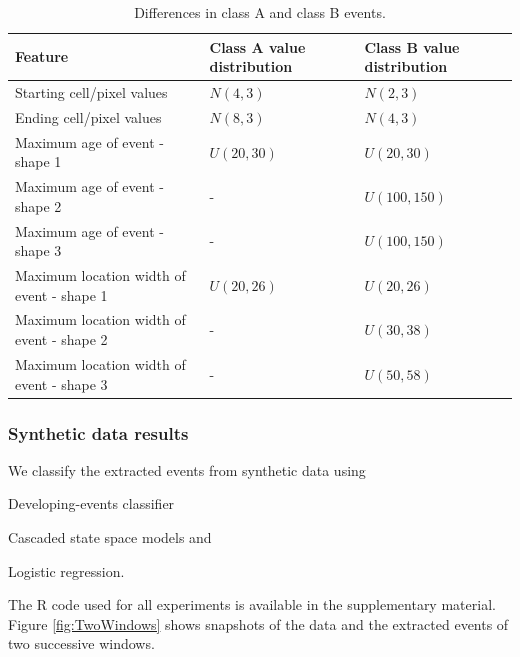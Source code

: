 \documentclass[a4paper,11pt]{article}
\begin{document}
\begin{table}[!ht]
	\centering
	\caption{Differences in class A and class B events. }
	\footnotesize
	\begin{tabular}{p{6cm}p{3.5cm}p{3.5cm}}
		\toprule
		Feature                                   & Class A value distribution & Class B value distribution \\
		\midrule
		Starting cell/pixel values                & $N(4,3)$                   & $N(2, 3)$                  \\
		Ending cell/pixel values                  & $N(8,3)$                   & $N(4, 3)$                  \\
		Maximum age of event - shape 1            & $U(20,30)$                 & $U(20,30)$                 \\
		Maximum age of event - shape 2            & -                          & $U(100,150)$               \\
		Maximum age of event - shape 3            & -                          & $U(100,150)$               \\
		Maximum location width of event - shape 1 & $U(20,26)$                 & $U(20,26)$                 \\
		Maximum location width of event - shape 2 & -                          & $U(30,38)$                 \\
		Maximum location width of event - shape 3 & -                          & $U(50,58)$                 \\
		\bottomrule
	\end{tabular}
	\label{tab:DiffClassAandB}
\end{table}

\subsubsection{Synthetic data results}

We classify the extracted events from synthetic data using \begin{inparaenum} \item Developing-events classifier \item Cascaded state space models and \item Logistic regression. \end{inparaenum} The R code used for all experiments is available in the supplementary material. Figure \ref{fig:TwoWindows} shows snapshots of the data and the extracted events of two successive windows.
\end{document}
